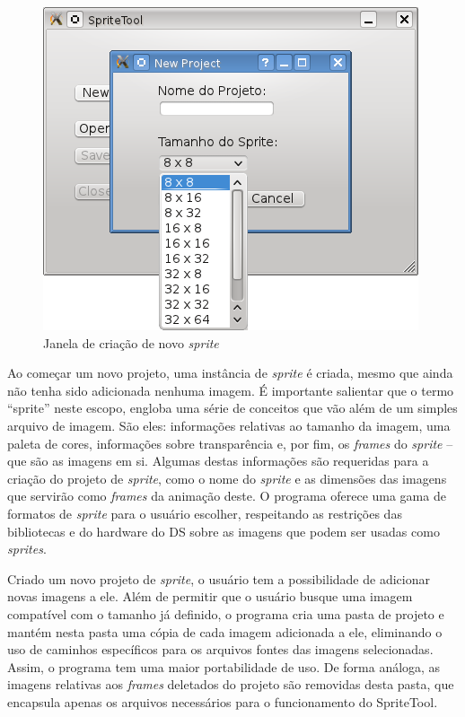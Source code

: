 \documentclass[brazil]{abnt}
\begin{document}
\begin{figure}[h!]
\centering
\includegraphics{imgs/spritetool1.png}
\caption{Janela de criação de novo \textit{sprite}} 
\end{figure}

Ao começar um novo projeto, uma instância de \textit{sprite} é criada, mesmo que ainda não tenha sido adicionada nenhuma imagem. É importante salientar que o termo ``sprite'' neste escopo, engloba uma série de conceitos que vão além de um simples arquivo de imagem. São eles: informações relativas ao tamanho da imagem, uma paleta de cores, informações sobre transparência e, por fim, os \textit{frames} do \textit{sprite} – que são as imagens em si.
Algumas destas informações são requeridas para a criação do projeto de \textit{sprite}, como o nome do \textit{sprite} e as dimensões das imagens que servirão como \textit{frames} da animação deste. O programa oferece uma gama de formatos de \textit{sprite} para o usuário escolher, respeitando as restrições das bibliotecas e do hardware do DS sobre as imagens que podem ser usadas como \textit{sprites}.

Criado um novo projeto de \textit{sprite}, o usuário tem a possibilidade de adicionar novas imagens a ele. Além de permitir que o usuário busque uma imagem compatível com o tamanho já definido, o programa cria uma pasta de projeto e mantém nesta pasta uma cópia de cada imagem adicionada a ele, eliminando o uso de caminhos específicos para os arquivos fontes das imagens selecionadas. Assim, o programa tem uma maior portabilidade de uso. De forma análoga, as imagens relativas aos \textit{frames} deletados do projeto são removidas desta pasta, que encapsula apenas os arquivos necessários para o funcionamento do SpriteTool.
\end{document}
